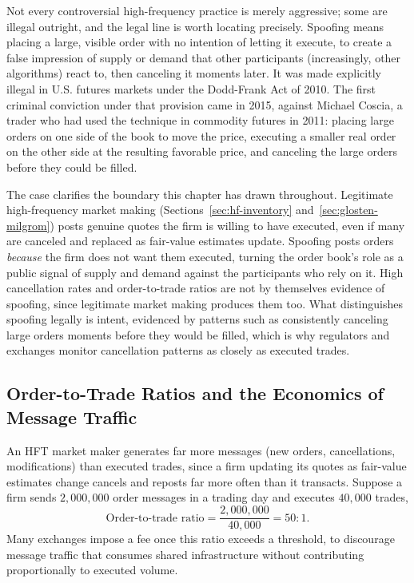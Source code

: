 \documentclass[../ai_in_finance]{subfiles}
\begin{document}
Not every controversial high-frequency practice is merely aggressive; some are illegal outright, and the legal line is worth locating precisely. Spoofing means placing a large, visible order with no intention of letting it execute, to create a false impression of supply or demand that other participants (increasingly, other algorithms) react to, then canceling it moments later. It was made explicitly illegal in U.S. futures markets under the Dodd-Frank Act of 2010. The first criminal conviction under that provision came in 2015, against Michael Coscia, a trader who had used the technique in commodity futures in 2011: placing large orders on one side of the book to move the price, executing a smaller real order on the other side at the resulting favorable price, and canceling the large orders before they could be filled.

The case clarifies the boundary this chapter has drawn throughout. Legitimate high-frequency market making (Sections~\ref{sec:hf-inventory} and~\ref{sec:glosten-milgrom}) posts genuine quotes the firm is willing to have executed, even if many are canceled and replaced as fair-value estimates update. Spoofing posts orders \emph{because} the firm does not want them executed, turning the order book's role as a public signal of supply and demand against the participants who rely on it. High cancellation rates and order-to-trade ratios are not by themselves evidence of spoofing, since legitimate market making produces them too. What distinguishes spoofing legally is intent, evidenced by patterns such as consistently canceling large orders moments before they would be filled, which is why regulators and exchanges monitor cancellation patterns as closely as executed trades.

\subsection{Order-to-Trade Ratios and the Economics of Message Traffic}
\label{sec:order-to-trade}

An HFT market maker generates far more messages (new orders, cancellations, modifications) than executed trades, since a firm updating its quotes as fair-value estimates change cancels and reposts far more often than it transacts. Suppose a firm sends $2{,}000{,}000$ order messages in a trading day and executes $40{,}000$ trades,
\begin{equation*}
\text{Order-to-trade ratio} = \frac{2{,}000{,}000}{40{,}000} = 50:1.
\end{equation*}
Many exchanges impose a fee once this ratio exceeds a threshold, to discourage message traffic that consumes shared infrastructure without contributing proportionally to executed volume.
\end{document}
